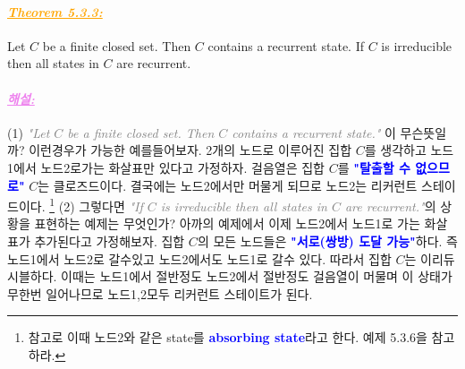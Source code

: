 \documentclass[12pt,oneside,english,a4paper]{article}
\newcommand{\paraviolet}[1]{\paragraph{\LARGE\textcolor{violet}{\it\underline{\textbf{#1:}}}}\LARGE}
\newcommand{\paraorange}[1]{\paragraph{\LARGE\textcolor{orange}{\it\underline{\textbf{#1:}}}}\LARGE}
\begin{document}
\paraorange{Theorem 5.3.3} Let $C$ be a finite closed set. Then $C$ contains a recurrent state. If $C$ is irreducible then all states in $C$ are recurrent.

\paraviolet{해설} (1) \textcolor{gray}{\emph{"Let $C$ be a finite closed set. Then $C$ contains a recurrent state."}} 이 무슨뜻일까? 이런경우가 가능한 예를들어보자. 2개의 노드로 이루어진 집합 $C$를 생각하고 노드1에서 노드2로가는 화살표만 있다고 가정하자. 걸음열은 집합 $C$를 \textcolor{blue}{\bf "탈출할 수 없으므로"} $C$는 클로즈드이다. 결국에는 노드2에서만 머물게 되므로 노드2는 리커런트 스테이드이다. \footnote{참고로 이때 노드2와 같은 state를 \textcolor{blue}{\textbf{absorbing state}}라고 한다. 예제 5.3.6을 참고하라.} (2) 그렇다면 \textcolor{gray}{\emph{"If $C$ is irreducible then all states in $C$ are recurrent."}}의 상황을 표현하는 예제는 무엇인가? 아까의 예제에서 이제 노드2에서 노드1로 가는 화살표가 추가된다고 가정해보자. 집합 $C$의 모든 노드들은 \textcolor{blue}{\bf "서로(쌍방) 도달 가능"}하다. 즉 노드1에서 노드2로 갈수있고 노드2에서도 노드1로 갈수 있다. 따라서 집합 $C$는 이리듀시블하다. 이때는 노드1에서 절반정도 노드2에서 절반정도 걸음열이 머물며 이 상태가 무한번 일어나므로 노드1,2모두 리커런트 스테이트가 된다. 
\end{document}
